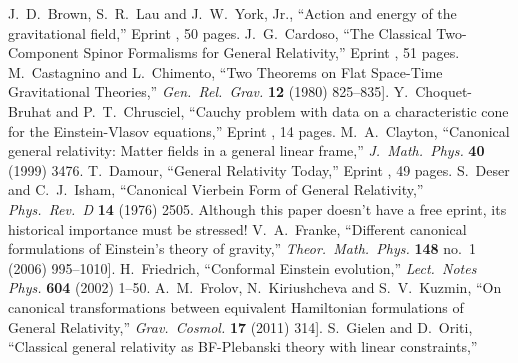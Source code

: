 \begin{thebibliography}{99}
  J.~D.~Brown, S.~R.~Lau and J.~W.~York, Jr.,\newblock
  ``Action and energy of the gravitational field,''\newblock
  Eprint , 50 pages.
  J.~G.~Cardoso,\newblock
  ``The Classical Two-Component Spinor Formalisms for General Relativity,''\newblock
  Eprint , 51 pages.
  M.~Castagnino and L.~Chimento,\newblock
  ``Two Theorems on Flat Space-Time Gravitational Theories,''\newblock
  \emph{Gen.\ Rel.\ Grav.} {\bf 12} (1980) 825--835\newblock
  [\arXiv[gr-qc]{1206.5341}].
  Y.~Choquet-Bruhat and P.~T.~Chrusciel,\newblock
  ``Cauchy problem with data on a characteristic cone for the Einstein-Vlasov equations,''\newblock
  Eprint , 14 pages.
  M.~A.~Clayton,\newblock
  ``Canonical general relativity: Matter fields in a general linear frame,''\newblock
  \emph{J.\ Math.\ Phys.} {\bf 40} (1999) 3476\newblock
  [\arXiv{gr-qc/9808005}].
  T.~Damour,\newblock
  ``General Relativity Today,''\newblock
  Eprint , 49 pages.
  S.~Deser and C.~J.~Isham,\newblock
  ``Canonical Vierbein Form of General Relativity,''\newblock
  \emph{Phys.\ Rev.\ D} {\bf 14} (1976) 2505.\newblock
  Although this paper doesn't have a free eprint, its historical
  importance must be stressed!
  V.~A.~Franke,\newblock
  ``Different canonical formulations of Einstein's theory of gravity,''\newblock
  \emph{Theor.\ Math.\ Phys.} {\bf 148} no.~1 (2006) 995--1010\newblock
  [\arXiv[gr-qc]{0710.4953}].
  H.~Friedrich,\newblock
  ``Conformal Einstein evolution,''\newblock
  \emph{Lect.\ Notes Phys.} {\bf 604} (2002) 1--50\newblock
  [\arXiv{gr-qc/0209018}].
  A.~M.~Frolov, N.~Kiriushcheva and S.~V.~Kuzmin,\newblock
  ``On canonical transformations between equivalent Hamiltonian formulations of General Relativity,''\newblock
  \emph{Grav.\ Cosmol.} {\bf 17} (2011) 314\newblock
  [\arXiv[gr-qc]{0809.1198}].
  S.~Gielen and D.~Oriti,\newblock
  ``Classical general relativity as BF-Plebanski theory with linear constraints,''\newblock

\end{thebibliography}
